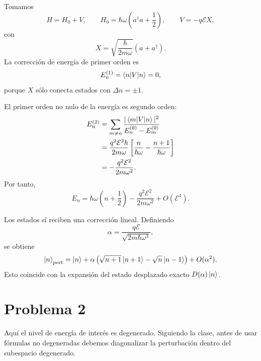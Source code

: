 \documentclass[11pt,a4paper]{article}
\numberwithin{equation}{section}
\renewcommand{\boxed}[1]{#1}
\newcommand{\hb}{\hbar}
\begin{document}
Tomamos
\begin{equation}
H=H_0+V,
\qquad
H_0=\hb\omega\left(a^\dagger a+\frac12\right),
\qquad
V=-q\mathcal E X,
\end{equation}
con
\begin{equation}
X=\sqrt{\frac{\hb}{2m\omega}}(a+a^\dagger).
\end{equation}
La corrección de energía de primer orden es
\begin{equation}
E_n^{(1)}=\braket{n|V|n}=0,
\end{equation}
porque $X$ sólo conecta estados con $\Delta n=\pm1$.

El primer orden no nulo de la energía es segundo orden:
\begin{align}
E_n^{(2)}&=\sum_{m\neq n}\frac{|\braket{m|V|n}|^2}{E_n^{(0)}-E_m^{(0)}}\\
&=\frac{q^2\mathcal E^2\hb}{2m\omega}
\left[\frac{n}{\hb\omega}-\frac{n+1}{\hb\omega}\right]\\
&=\boxed{-\frac{q^2\mathcal E^2}{2m\omega^2}.}
\end{align}
Por tanto,
\begin{equation}
\boxed{E_n=\hb\omega\left(n+\frac12\right)-\frac{q^2\mathcal E^2}{2m\omega^2}+O(\mathcal E^4).}
\end{equation}

Los estados sí reciben una corrección lineal. Definiendo
\begin{equation}
\alpha=\frac{q\mathcal E}{\sqrt{2m\hb\omega^3}},
\end{equation}
se obtiene
\begin{equation}
\boxed{\ket{n}_{\rm pert}=\ket n+\alpha\left(\sqrt{n+1}\ket{n+1}-\sqrt n\ket{n-1}\right)+O(\alpha^2).}
\end{equation}
Esto coincide con la expansión del estado desplazado exacto $D(\alpha)\ket n$.

\section{Problema 2}
Aquí el nivel de energía de interés es degenerado. Siguiendo la clase, antes de usar fórmulas no degeneradas debemos diagonalizar la perturbación dentro del subespacio degenerado.
\end{document}
